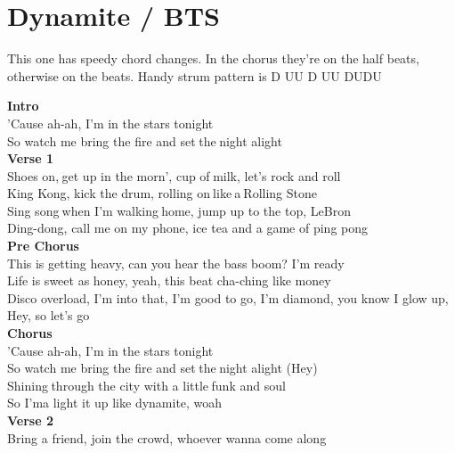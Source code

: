 \section{Dynamite / BTS}\label{sec:dynamite}
\small{This one has speedy chord changes. In the chorus they're on the half beats, otherwise on the beats. Handy strum pattern is D UU D UU DUDU}
\BminorSeven
\Eminor
\Amajor
\DmajorEasy
\CsharpMinor
\FsharpMinor
\Bmajor
\EmajorEasy

\textbf{Intro}\\
'Cause ah-ah, I'm in the stars tonight  \\                                
So watch me bring the fire and set the night alight\\
\textbf{Verse 1}\\
Shoes on, get up in the morn', cup of milk, let's rock and roll\\
King Kong, kick the drum, rolling on like a Rolling Stone\\
Sing song when I'm walking home, jump up to the top, LeBron\\
Ding-dong, call me on my phone, ice tea and a game of ping pong\\
\textbf{Pre Chorus}\\
This is getting heavy, can you hear the bass boom? I'm ready\\
Life is sweet as honey, yeah, this beat cha-ching like money\\
Disco overload, I'm into that, I'm good to go, I'm diamond, you know I glow up, Hey, so let's go\\
\textbf{Chorus}\\
'Cause ah-ah, I'm in the stars tonight\\
So watch me bring the fire and set the night alight (Hey)\\
Shining through the city with a little funk and soul\\
So I'ma light it up like dynamite, woah\\
\textbf{Verse 2}\\
Bring a friend, join the crowd, whoever wanna come along\\

